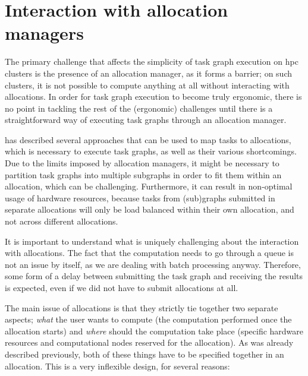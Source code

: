\section{Interaction with allocation managers}
The primary challenge that affects the simplicity of task graph execution on
\gls{hpc} clusters is the presence of an allocation manager, as it forms a barrier;
on such clusters, it is not possible to compute anything at all without interacting with
allocations. In order for task graph execution to become truly ergonomic, there is no point in
tackling the rest of the (ergonomic) challenges until there is a straightforward way of executing
task graphs through an allocation manager.

 has described several approaches that can be used to map tasks to
allocations, which is necessary to execute task graphs, as well as their various shortcomings. Due
to the limits imposed by allocation managers, it might be necessary to partition task graphs into
multiple subgraphs in order to fit them within an allocation, which can be challenging.
Furthermore, it can result in non-optimal usage of hardware resources, because tasks from
(sub)graphs submitted in separate allocations will only be load balanced within their own
allocation, and not across different allocations.

It is important to understand what is uniquely challenging about the interaction with allocations.
The fact that the computation needs to go through a queue is not an issue by itself, as we are
dealing with batch processing anyway. Therefore, some form of a delay between submitting the task
graph and receiving the results is expected, even if we did not have to submit allocations at all.

The main issue of allocations is that they strictly tie together two separate aspects;
\emph{what} the user wants to compute (the computation performed once the allocation
starts) and \emph{where} should the computation take place (specific hardware resources
and computational nodes reserved for the allocation). As was already described previously, both of
these things have to be specified together in an allocation. This is a very inflexible design, for
several reasons:

